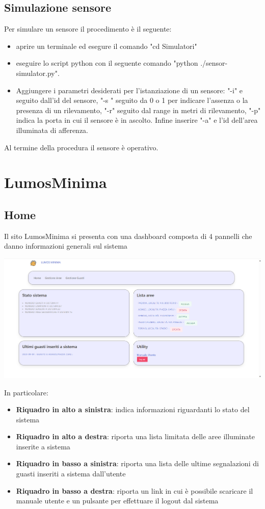 \documentclass[9pt]{article}
\begin{document}
\subsection{Simulazione sensore}
Per simulare un sensore il procedimento è il seguente:
\begin{itemize}
	\item aprire un terminale ed esegure il comando "cd Simulatori"
	\item eseguire lo script python con il seguente comando "python ./sensor-simulator.py". 
	\item Aggiungere i parametri desiderati per l'istanziazione di un sensore: "-i" e seguito dall'id del sensore, "-s " seguito da 0 o 1 per indicare l'assenza o la presenza di un rilevamento, "-r" seguito dal range in metri di rilevamento, "-p" indica la porta in cui il sensore è in ascolto. Infine inserire "-a" e l'id dell'area illuminata di afferenza.
\end{itemize}
Al termine della procedura il sensore è operativo.
\section{LumosMinima}
\subsection{Home}
Il sito LumosMinima si presenta con una dashboard composta di 4 pannelli che danno informazioni generali
sul sistema

\begin{center}
	\includegraphics[scale=0.3]{LumosMinimaHome.png}
\end{center}

In particolare:
\begin{itemize}
	\item \textbf{Riquadro in alto a sinistra}: indica informazioni riguardanti lo stato del sistema
	\item \textbf{Riquadro in alto a destra}: riporta una lista limitata delle aree illuminate inserite a sistema
	\item \textbf{Riquadro in basso a sinistra}: riporta una lista delle ultime segnalazioni di guasti inseriti a sistema dall'utente
	\item \textbf{Riquadro in basso a destra}: riporta un link in cui è possibile scaricare il manuale utente e un pulsante per effettuare il logout dal sistema\\
\end{itemize}
\end{document}
